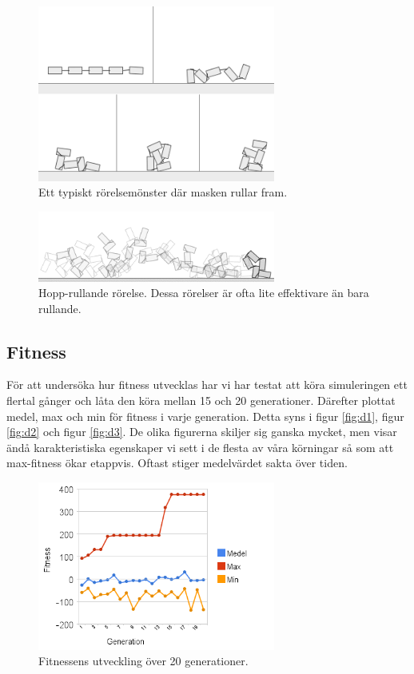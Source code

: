 \documentclass[titlepage, twocolumn, a4paper, 11pt, swedish]{article}
\begin{document}
\begin{figure}
    \includegraphics[width=78mm]{images/mask1_gs.png}
    \caption{Ett typiskt rörelsemönster där masken rullar fram.}
    \label{fig:r1}
\end{figure}

\begin{figure}
    \includegraphics[width=78mm]{images/maskninja.png}
    \caption{Hopp-rullande rörelse. Dessa rörelser är ofta lite effektivare än bara rullande.}
    \label{fig:r2}
\end{figure}

\subsection{Fitness}
För att undersöka hur fitness utvecklas har vi har testat att köra simuleringen ett flertal gånger och låta den köra mellan 15 och 20 generationer. Därefter plottat medel, max och min för fitness i varje generation. Detta syns i figur \vref{fig:d1}, figur \vref{fig:d2} och figur \vref{fig:d3}. De olika figurerna skiljer sig ganska mycket, men visar ändå karakteristiska egenskaper vi sett i de flesta av våra körningar så som att max-fitness ökar etappvis. Oftast stiger medelvärdet sakta över tiden.

\begin{figure}
    \includegraphics[width=78mm]{images/diagram4.png}
    \caption{Fitnessens utveckling över 20 generationer.}
    \label{fig:d1}
\end{figure}
\end{document}
